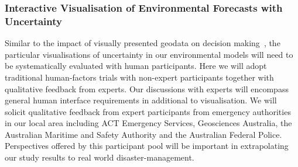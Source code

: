 \subsubsection*{Interactive Visualisation of Environmental Forecasts with Uncertainty}

Similar to the impact of visually presented geodata on decision
making~\parencite{kinkeldey2015evaluating}, the particular
visualisations of uncertainty in our environmental models will need to
be systematically evaluated with human participants. Here we will
adopt traditional human-factors trials with non-expert participants
together with qualitative feedback from experts. Our discussions with 
experts will encompass general human interface requirements in additional to 
visualisation. We
will solicit qualitative feedback from expert participants 
from
emergency authorities in our local area including ACT Emergency
Services, Geosciences Australia, the Australian Maritime and Safety
Authority and the Australian Federal Police. Perspectives offered by
this participant pool will be important in extrapolating our study
results to real world disaster-management.

